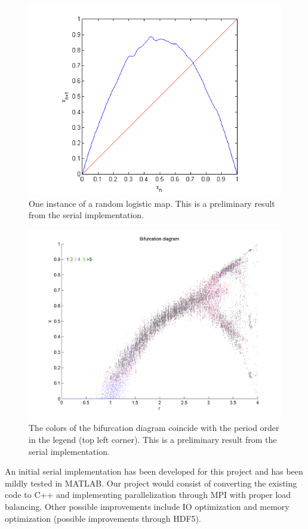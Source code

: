 \documentclass[12pt]{article}
\begin{document}
\begin{figure}[H]
	\begin{center}
		\includegraphics[scale=0.7]{random_cobweb}
\caption{One instance of a random logistic map. This is a preliminary result from the serial implementation.}
	\end{center}
\end{figure}
\begin{figure}[H]
	\begin{center}
		\includegraphics[scale=0.5]{bif}
\caption{The colors of the bifurcation diagram coincide with the
  period order in the legend (top left corner). This is a preliminary result from the serial implementation.}
	\end{center}
\end{figure}
An initial serial implementation has been developed for this project
and has been mildly tested in
MATLAB. Our project would consist of converting the existing code to
C++ and implementing parallelization through MPI with proper load balancing. Other possible improvements include
IO optimization and memory optimization (possible improvements through
HDF5). 
\end{document}

